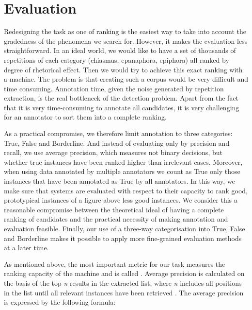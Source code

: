 \section{Evaluation}
Redesigning the task as one of ranking is the easiest way to take into account the gradedness of the phenomena we search for. However, it makes the evaluation less straightforward. In an ideal world, we would like to have a set of thousands of repetitions of each category (chiasmus, epanaphora, epiphora) all ranked by degree of rhetorical effect. Then we would try to achieve this exact ranking with a machine. The problem is that creating such a corpus would be very difficult and time consuming. Annotation time, given the noise generated by repetition extraction, is the real bottleneck of the detection problem. Apart from the fact that it is very time-consuming to annotate all candidates, it is very challenging for an annotator to sort them into a complete ranking. 

As a practical compromise, we therefore limit annotation to three categories: True, False and Borderline. And instead of evaluating only by precision and recall, we use average precision, which measures not binary decisions, but whether true instances have been ranked higher than irrelevant cases. Moreover, when using data annotated by multiple annotators we count as True only those instances that have been annotated as True by all annotators. In this way, we make sure that systems are evaluated with respect to their capacity to rank good, prototypical instances of a figure above less good instances. We consider this a reasonable compromise between the theoretical ideal of having a complete ranking of candidates and the practical necessity of making annotation and evaluation feasible. Finally, our use of a three-way categorisation into True, False and Borderline makes it possible to apply more fine-grained evaluation methods at a later time.

As mentioned above, the most important metric for our task measures the ranking capacity of the machine and is called .
Average precision is calculated on the basis of the top \textit{n} results in the extracted list, where \textit{n} includes all positions in the list until all relevant instances have been retrieved \citep{Zhang2009}. The average precision is expressed by the following formula:

